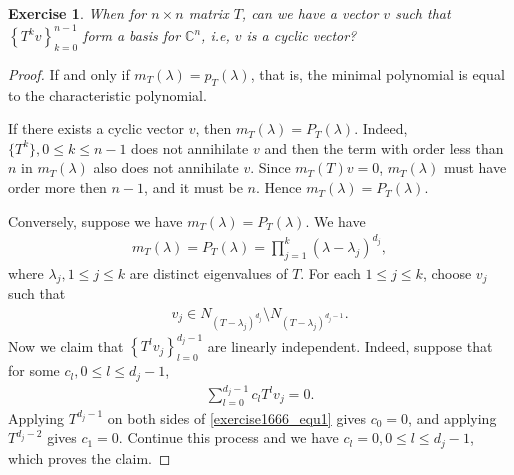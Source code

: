 \documentclass[11pt]{book}
\newtheorem{exercise}{Exercise}[section]
\theoremstyle{definition}
\numberwithin{equation}{chapter}
\begin{document}
\begin{exercise}
When for $n \times n$ matrix $T$, can we have a vector $v$ such that $\left\{T^kv\right\}^{n-1}_{k=0}$ form a basis for $\mathbb{C}^n$, i.e, $v$ is a cyclic vector?
\end{exercise}
\begin{proof}
If and only if $m_T(\lambda) = p_T(\lambda)$, that is, the minimal polynomial is equal to the characteristic polynomial.

If there exists a cyclic vector $v$, then $m_T(\lambda) = P_T(\lambda)$. Indeed, $\{T^{k}\}, 0 \leq k \leq n - 1$ does not annihilate $v$ and then the term with order less than $n$ in $m_T(\lambda)$ also does not annihilate $v$. Since $m_T(T)v = 0$, $m_T(\lambda)$ must have order more then $n - 1$, and it must be $n$. Hence $m_T(\lambda) = P_T(\lambda)$. 

Conversely, suppose we have $m_T(\lambda) = P_T(\lambda)$. We have
\begin{align*}
    m_T(\lambda) = P_T(\lambda) = \prod^k_{j=1} \left(\lambda - \lambda_j\right)^{d_j},
\end{align*}
where $\lambda_j, 1 \leq j \leq k$ are distinct eigenvalues of $T$. For each $1 \leq j \leq k$, choose $v_j$ such that
\begin{align*}
    v_j \in N_{(T - \lambda_j)^{d_j}} \setminus N_{(T - \lambda_j)^{d_j - 1}}.
\end{align*}
Now we claim that $\left\{T^lv_j\right\}^{d_j-1}_{l=0}$ are linearly independent. Indeed, suppose that for some $c_l, 0 \leq l \leq d_j - 1$,
\begin{align}\label{exercise1666_equ1}
    \sum^{d_j-1}_{l=0} c_l T^lv_j = 0.
\end{align}
Applying $T^{d_j-1}$ on both sides of \eqref{exercise1666_equ1} gives $c_0 = 0$, and applying $T^{d_j-2}$ gives $c_1 = 0$. Continue this process and we have $c_l = 0, 0 \leq l \leq d_j - 1$, which proves the claim. 


\end{proof}
\end{document}
